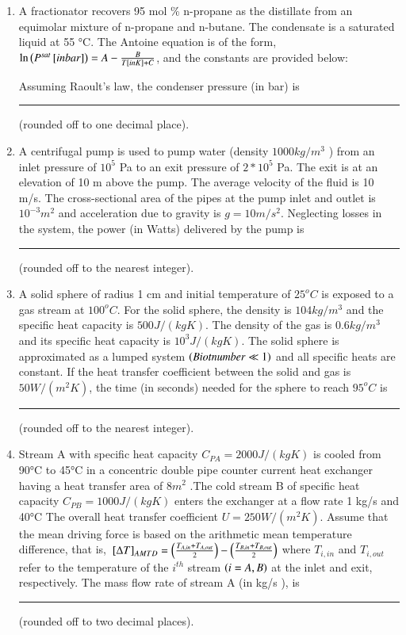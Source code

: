\documentclass[journal,12pt,onecolumn]{IEEEtran}
\theoremstyle{remark}
\begin{document}
\begin{enumerate}
    \item A fractionator recovers 95 mol \% n-propane as the distillate from an equimolar mixture of n-propane and n-butane. The condensate is a saturated liquid at 55 °C. The Antoine equation is of the form, $\ln\left(P^{sat}{}\left[in bar\right]\right) = A - \frac{B}{T{}\left[in K\right] + C}$, and the constants are provided below: 

    

    Assuming Raoult's law, the condenser pressure (in bar) is \rule{3cm}{0.1mm} (rounded off to one decimal place).

    \item A centrifugal pump is used to pump water (density $1000 kg/m^3$ ) from an inlet pressure of $10^5$ Pa to an exit pressure of $2*10^5$ Pa. The exit is at an elevation of 10 m above the pump. The average velocity of the fluid is 10 m/s. The cross-sectional area of the pipes at the pump inlet and outlet is $10^{-3} m^2$ and acceleration due to gravity is $g = 10 m/s^2 $. Neglecting losses in the system, the power (in Watts) delivered by the pump is \rule{1.5cm}{0.1mm}(rounded off to the nearest integer). 

    \item A solid sphere of radius 1 cm and initial temperature of $25^oC$ is exposed to a gas stream at $100^oC$. For the solid sphere, the density is $104 kg/m^3$ and the specific heat capacity is $500 J/(kg K)$. The density of the gas is $0.6 kg/m^3$ and its specific heat capacity is $10^3 J/(kg K)$. The solid sphere is approximated as a lumped system $\left(Biot number \ll 1\right)$ and all specific heats are constant. If the heat transfer coefficient between the solid and gas is $50 W/(m^2 K)$, the time (in seconds) needed for the sphere to reach $95^oC$ is \rule{2cm}{0.1mm} (rounded off to the nearest integer).

    \item Stream A with specific heat capacity $C_{PA}= 2000 J/(kg K)$ is cooled from 90°C to 45°C in a concentric double pipe counter current heat exchanger having a heat transfer area of $8m^2$ .The cold stream B of specific heat capacity $C_{PB} = 1000 J/(kg K)$ enters the exchanger at a flow rate 1 kg/s and 40°C The overall heat transfer coefficient $U = 250 W/(m^2 K)$. Assume that the mean driving force is based on the arithmetic mean temperature difference, that is, ${}\left[\Delta T\right]_{AMTD} = \left(\frac{T_{A,in} + T_{A,out}}{2}\right) - \left(\frac{T_{B,in} + T_{B,out}}{2}\right)$ where $T_{i,in}$ and $T_{i,out}$ refer to the temperature of the $i^{th}$ stream $\left(i = A, B\right)$ at the inlet and exit, respectively. The mass flow rate of stream A (in kg/s ), is \rule{2cm}{0.1mm}(rounded off to two decimal places).


\end{enumerate}
\end{document}
